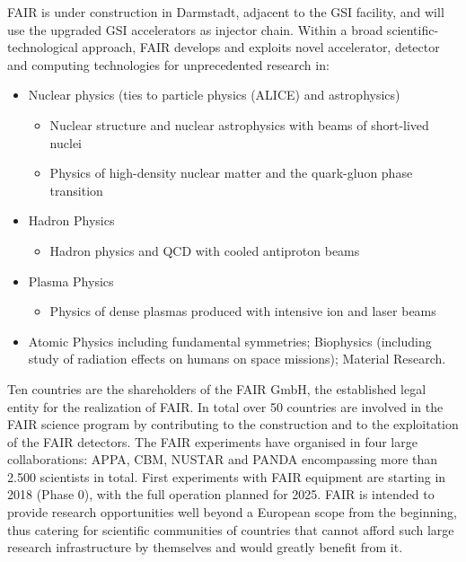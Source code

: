 \documentclass[fleqn,10pt]{wlscirep}
\begin{document}
{FAIR is under construction in Darmstadt, adjacent to the GSI facility, and will use the upgraded GSI accelerators as injector chain. Within a broad scientific-technological approach, FAIR develops and exploits novel accelerator, detector and computing technologies for unprecedented research in:
 \begin{itemize}
 \item Nuclear physics (ties to particle physics (ALICE) and astrophysics)
 \begin{itemize}
   \item Nuclear structure and nuclear astrophysics with beams of short-lived nuclei
   \item Physics of high-density nuclear matter and the quark-gluon phase transition
 \end{itemize}
 \item Hadron Physics
 \begin{itemize}
 \item Hadron physics and QCD with cooled antiproton beams
 \end{itemize}
 \item Plasma Physics
 \begin{itemize}
 \item Physics of dense plasmas produced with intensive ion and laser beams
 \end{itemize}
 \item Atomic Physics including fundamental symmetries; Biophysics (including study of radiation effects on humans on space missions); Material Research.
 \end{itemize}
 
Ten countries are the shareholders of the FAIR GmbH, the established legal entity for the realization of FAIR. In total over 50 countries are involved in the FAIR science program by contributing to the construction and to the exploitation of the FAIR detectors. The FAIR experiments have organised in four large collaborations: APPA, CBM, NUSTAR and PANDA encompassing more than 2.500 scientists in total. First experiments with FAIR equipment are starting in 2018 (Phase 0), with the full operation planned for 2025. FAIR is intended to provide research opportunities well beyond a European scope from the beginning, thus catering for scientific communities of countries that cannot afford such large research infrastructure by themselves and would greatly benefit from it.

}
\end{document}
